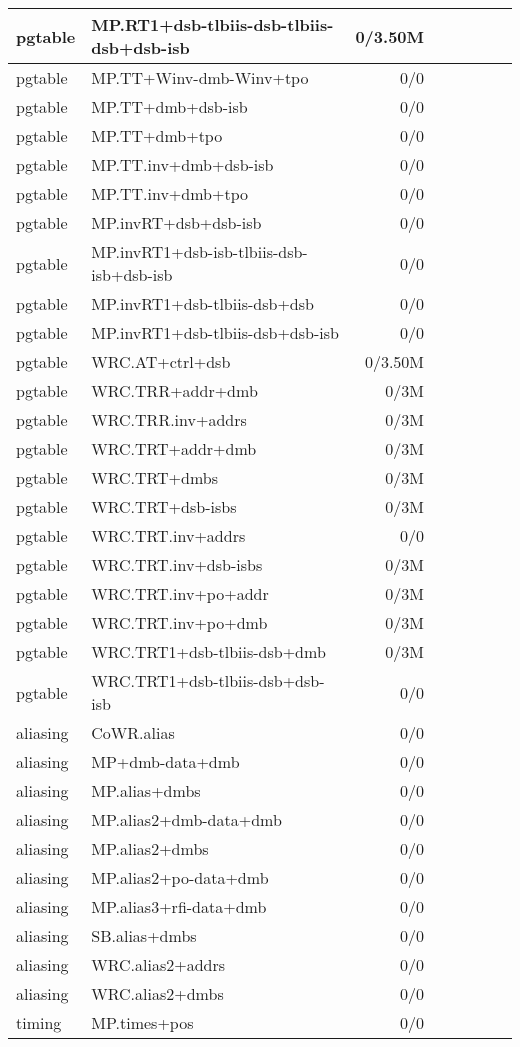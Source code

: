 \begin{tabular}{l l  | r r l | r r l}
\hline
   pgtable&MP.RT1+dsb-tlbiis-dsb-tlbiis-dsb+dsb-isb&0/3.50M&&&\\
\hline
   pgtable&MP.TT+Winv-dmb-Winv+tpo&0/0&&&\\
\hline
   pgtable&MP.TT+dmb+dsb-isb&0/0&&&\\
\hline
   pgtable&MP.TT+dmb+tpo&0/0&&&\\
\hline
   pgtable&MP.TT.inv+dmb+dsb-isb&0/0&&&\\
\hline
   pgtable&MP.TT.inv+dmb+tpo&0/0&&&\\
\hline
   pgtable&MP.invRT+dsb+dsb-isb&0/0&&&\\
\hline
   pgtable&MP.invRT1+dsb-isb-tlbiis-dsb-isb+dsb-isb&0/0&&&\\
\hline
   pgtable&MP.invRT1+dsb-tlbiis-dsb+dsb&0/0&&&\\
\hline
   pgtable&MP.invRT1+dsb-tlbiis-dsb+dsb-isb&0/0&&&\\
\hline
   pgtable&WRC.AT+ctrl+dsb&0/3.50M&&&\\
\hline
   pgtable&WRC.TRR+addr+dmb&0/3M&&&\\
\hline
   pgtable&WRC.TRR.inv+addrs&0/3M&&&\\
\hline
   pgtable&WRC.TRT+addr+dmb&0/3M&&&\\
\hline
   pgtable&WRC.TRT+dmbs&0/3M&&&\\
\hline
   pgtable&WRC.TRT+dsb-isbs&0/3M&&&\\
\hline
   pgtable&WRC.TRT.inv+addrs&0/0&&&\\
\hline
   pgtable&WRC.TRT.inv+dsb-isbs&0/3M&&&\\
\hline
   pgtable&WRC.TRT.inv+po+addr&0/3M&&&\\
\hline
   pgtable&WRC.TRT.inv+po+dmb&0/3M&&&\\
\hline
   pgtable&WRC.TRT1+dsb-tlbiis-dsb+dmb&0/3M&&&\\
\hline
   pgtable&WRC.TRT1+dsb-tlbiis-dsb+dsb-isb&0/0&&&\\
\hline
   aliasing&CoWR.alias&0/0&&&\\
\hline
   aliasing&MP+dmb-data+dmb&0/0&&&\\
\hline
   aliasing&MP.alias+dmbs&0/0&&&\\
\hline
   aliasing&MP.alias2+dmb-data+dmb&0/0&&&\\
\hline
   aliasing&MP.alias2+dmbs&0/0&&&\\
\hline
   aliasing&MP.alias2+po-data+dmb&0/0&&&\\
\hline
   aliasing&MP.alias3+rfi-data+dmb&0/0&&&\\
\hline
   aliasing&SB.alias+dmbs&0/0&&&\\
\hline
   aliasing&WRC.alias2+addrs&0/0&&&\\
\hline
   aliasing&WRC.alias2+dmbs&0/0&&&\\
\hline
   timing&MP.times+pos&0/0&&&\\
\hline
\hline
\end{tabular}
